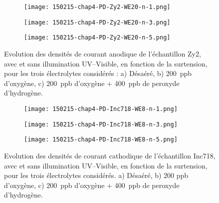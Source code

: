 \begin{refsection}
    \renewcommand{\localfigwidth}{0.5\textwidth}
    \begin{figure}[H]
            \centering
            \begin{subfigure}[b]{\localfigwidth}
                \texttt{[image: 150215-chap4-PD-Zy2-WE20-n-1.png]}
                \caption{}
                \label{}
            \end{subfigure}
            \begin{subfigure}[b]{\localfigwidth}
                \texttt{[image: 150215-chap4-PD-Zy2-WE20-n-3.png]}
                \caption{}
                \label{}
            \end{subfigure}
            \begin{subfigure}[b]{\localfigwidth}
                \texttt{[image: 150215-chap4-PD-Zy2-WE20-n-5.png]}
                \caption{}
                \label{}
            \end{subfigure}
            \caption{Evolution des densités de courant anodique de l’échantillon Zy2, avec et sans illumination
            UV--Visible, en fonction de la surtension, pour les trois électrolytes considérés : a) Désaéré, b) 200~ppb
        d’oxygène, c) 200~ppb d’oxygène + 400~ppb de peroxyde d’hydrogène.}
            \label{fig:ch4_Zy2_Tafel}
    \end{figure}

    \begin{figure}[H]
            \centering
            \begin{subfigure}[b]{\localfigwidth}
                \texttt{[image: 150215-chap4-PD-Inc718-WE8-n-1.png]}
                \caption{}
                \label{}
            \end{subfigure}
            \begin{subfigure}[b]{\localfigwidth}
                \texttt{[image: 150215-chap4-PD-Inc718-WE8-n-3.png]}
                \caption{}
                \label{}
            \end{subfigure}
            \begin{subfigure}[b]{\localfigwidth}
                \texttt{[image: 150215-chap4-PD-Inc718-WE8-n-5.png]}
                \caption{}
                \label{}
            \end{subfigure}
            \caption{Evolution des densités de courant cathodique de l’échantillon Inc718, avec et sans illumination
            UV--Visible, en fonction de la surtension, pour les trois électrolytes considérés. a) Désaéré, b) 200 ppb
        d’oxygène, c) 200~ppb d’oxygène + 400~ppb de peroxyde d’hydrogène.}
            \label{fig:ch4_718_Tafel}
    \end{figure}



\end{refsection}

